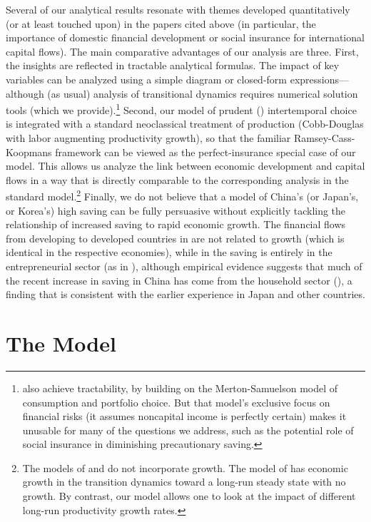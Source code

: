 \documentclass[titlepage]{\econtex}\newcommand{\texname}{cjSOE}
\begin{document}
Several of our analytical results resonate with themes developed quantitatively (or
at least touched upon) in the papers cited above (in particular, the importance of
domestic financial development or social insurance for international
capital flows). The main comparative advantages of our analysis are
three.  First, the insights are reflected in tractable analytical
formulas. The impact of key variables can be analyzed using a simple
diagram or closed-form expressions---although (as usual) analysis of
transitional dynamics requires numerical solution tools (which we
provide).\footnote{\cite{paEntrep} also achieve
  tractability, by building on the Merton-Samuelson model
  of consumption and portfolio choice.  But that model's exclusive
  focus on financial risks (it assumes noncapital income is perfectly
  certain) makes it unusable for many of the questions we address,
  such as the potential role of social insurance in diminishing
  precautionary saving.}  Second, our model of prudent (\cite{kimball:smallandlarge})
intertemporal choice is integrated with a standard neoclassical
treatment of production (Cobb-Douglas with labor augmenting
productivity growth), so that the familiar Ramsey-Cass-Koopmans
framework can be viewed as the perfect-insurance special case of our
model. This allows us analyze the link between economic development
and capital flows in a way that is directly comparable to the
corresponding analysis in the standard model.\footnote{The models of
  \cite{fogliPerriMod} and \cite{mqrImbal} do not incorporate
  growth. The model of \cite{sandri:growthcapflows} has economic
  growth in the transition dynamics toward a long-run steady state
  with no growth. By contrast, our model allows one to look at the
  impact of different long-run productivity growth rates. }
Finally, we do not believe that a model of China's (or Japan's, or Korea's)
high saving can be fully persuasive without explicitly tackling the
relationship of increased saving to rapid economic growth.  The
financial flows from developing to developed countries in
\cite{mqrImbal} are not related to growth (which is identical in the
respective economies), while in \cite{sandri:growthcapflows} the
saving is entirely in the entrepreneurial sector (as in
\cite{paEntrep}), although empirical evidence suggests that much of the recent increase in saving in China has come from the
household sector (\cite{syChina}), a finding that is consistent with
the earlier experience in Japan and other countries.

\section{The Model}
\end{document}
